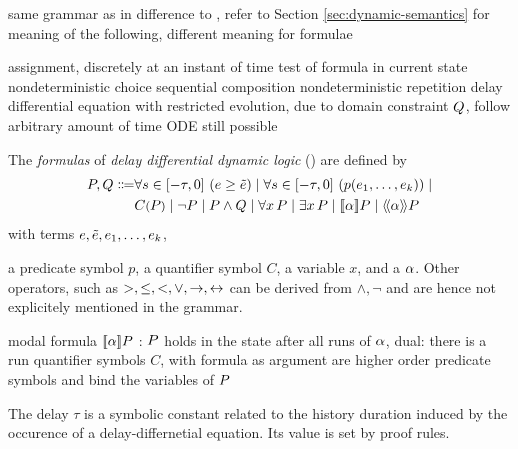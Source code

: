         same grammar as in \cite{Platzer15Uniform}
        difference to \dL, refer to Section \ref{sec:dynamic-semantics} for meaning of the following, different meaning for formulae

        assignment, discretely at an instant of time
        test of formula in current state
        nondeterministic choice
        sequential composition
        nondeterministic repetition
        delay differential equation with restricted evolution, due to domain constraint $Q$, follow arbitrary amount of time
        ODE still possible



    \begin{definition}\label{def:syntax-formula}
        The \emph{formulas} of \emph{delay differential dynamic logic} (\ddL) are defined by
        \begin{align}
            \asfml,\bsfml \Coloneqq
                &\delay{\astrm\geq\bstrm} \mid
                \delay{p(\range{\istrm{1}}{\istrm{k}})} \mid\\
                &\contextapp{C}{\asfml} \mid
                \lnot\asfml \mid
                \asfml\land\bsfml \mid
                \lforall{x}{\asfml} \mid
                \lexists{x}{\asfml} \mid
                \dbox{\asprg}{\asfml} \mid
                \ddiamond{\asprg}{\asfml}
        \end{align}
        with terms $e,\tilde{e},e_{1},\ldots,e_{k}$,

        a predicate symbol $p$, a quantifier symbol $C$, a variable $x$, and a \HP $\alpha$.
        Other operators, such as $>,\leq,<,\lor,\rightarrow,\leftrightarrow$ can be derived from $\land,\lnot$ and are hence not explicitely mentioned in the grammar.

        modal formula $\dbox{\asprg}{\asfml}$ : $P$ holds in the state after all runs of $\alpha$, dual: there is a run
        quantifier symbols $C$, with formula as argument are higher order predicate symbols and bind the variables of $P$

        The delay $\tau$ is a symbolic constant related to the history duration induced by the occurence of a delay-differnetial equation. Its value is set by proof rules.
    \end{definition}

